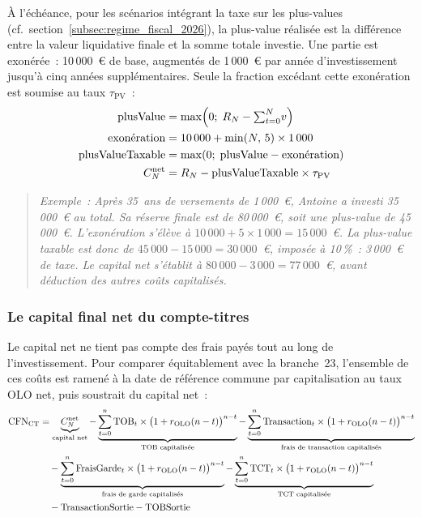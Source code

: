 ﻿\documentclass[12pt, a4paper]{article}
\begin{document}
À l'échéance, pour les scénarios intégrant la taxe sur les plus-values 
(cf.~section~\ref{subsec:regime_fiscal_2026}), 
la plus-value réalisée est la différence entre la valeur
liquidative finale et la somme totale investie. Une partie est exonérée~:
10\,000~€ de base, augmentés de 1\,000~€ par année d'investissement jusqu'à
cinq années supplémentaires. Seule la fraction excédant cette
exonération est soumise au taux $\tau_{\text{PV}}$~:
\begin{align}
  \text{plusValue}        &= \max\!\left(0;\; R_N - {\textstyle\sum_{t=0}^{N}} v\right) \notag \\
  \text{exonération}      &= 10\,000 + \min(N,\,5) \times 1\,000 \notag \\
  \text{plusValueTaxable} &= \max\!\left(0;\; \text{plusValue} - \text{exonération}\right) \notag \\
  C_N^{\text{net}}        &= R_N - \text{plusValueTaxable} \times \tau_{\text{PV}}
\end{align}

\begin{quote}
\textit{Exemple~: Après 35~ans de versements de 1\,000~€, Antoine a investi
35\,000~€ au total. Sa réserve finale est de 80\,000~€, soit une plus-value de
45\,000~€. L'exonération s'élève à $10\,000 + 5 \times 1\,000 = 15\,000$~€.
La plus-value taxable est donc de $45\,000 - 15\,000 = 30\,000$~€, imposée à
10\,\%~: 3\,000~€ de taxe. Le capital net s'établit à
$80\,000 - 3\,000 = 77\,000$~€, avant déduction des autres coûts capitalisés.}
\end{quote}

\newpage

\subsubsection*{Le capital final net du compte-titres}
\label{sub:va_ct_formule}

Le capital net ne tient pas compte des frais payés tout au long de
l'investissement. Pour comparer équitablement avec la branche~23, l'ensemble
de ces coûts est ramené à la date de référence commune par capitalisation au
taux OLO net, puis soustrait du capital net~:
\begin{align}
  \text{CFN}_{\text{CT}} &=
    \underbrace{C_N^{\text{net}}}_{\text{capital net}}
  -
    \underbrace{%
      \sum_{t=0}^{n} \text{TOB}_t \times \bigl(1 + r_{\text{OLO}}(n-t)\bigr)^{n-t}
    }_{\text{TOB capitalisée}}
  -
    \underbrace{%
      \sum_{t=0}^{n} \text{Transaction}_t \times \bigl(1 + r_{\text{OLO}}(n-t)\bigr)^{n-t}
    }_{\text{frais de transaction capitalisés}} \notag \\
  &\quad
  -
    \underbrace{%
      \sum_{t=0}^{n} \text{FraisGarde}_t \times \bigl(1 + r_{\text{OLO}}(n-t)\bigr)^{n-t}
    }_{\text{frais de garde capitalisés}}
  -
    \underbrace{%
      \sum_{t=0}^{n} \text{TCT}_t \times \bigl(1 + r_{\text{OLO}}(n-t)\bigr)^{n-t}
    }_{\text{TCT capitalisée}} \notag \\
  &\quad
  -
    \text{TransactionSortie}
  -
    \text{TOBSortie}
\end{align}
\end{document}
